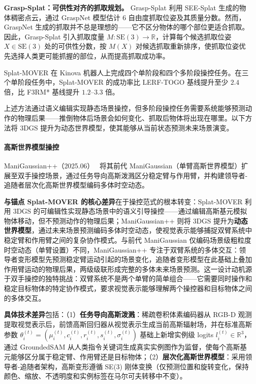 \textbf{Grasp-Splat：可供性对齐的抓取规划。}
Grasp-Splat 利用 SEE-Splat 生成的物体稠密点云，通过 GraspNet 模型估计 6 自由度抓取位姿及其质量分数。然而，GraspNet 生成的抓取并不总是理想的——它不区分物体的哪个部位更适合抓取。因此，Grasp-Splat 引入抓取度量 $M: \text{SE}(3) \to \mathbb{R}$，计算每个候选抓取位姿 $X \in \text{SE}(3)$ 处的可供性分数，按 $M(X)$ 对候选抓取重新排序，使抓取位姿优先选择人类更可能抓握的部位，从而提高抓取成功率。

Splat-MOVER 在 Kinova 机器人上完成四个单阶段和四个多阶段操控任务。在三个单阶段任务中，Splat-MOVER 的成功率比 LERF-TOGO 基线提升至少 $2.4$ 倍，比 F3RM* 基线提升 $1.2$--$3.3$ 倍。

上述方法通过语义编辑实现静态场景操控，但多阶段操控任务需要系统能够预测动作的物理后果——推倒物体后场景会如何变化、抓取后物体将出现在哪里。以下方法将 3DGS 提升为动态世界模型，使其能够从当前状态预测未来场景演变。

\paragraph{高斯世界模型操控}

ManiGaussian++（2025.06）~\cite{2506_19842} 将其前代 ManiGaussian（单臂高斯世界模型）扩展至双手操控场景，通过任务导向高斯泼溅区分稳定臂与作用臂，并构建领导者-追随者层次化高斯世界模型编码多体时空动态。

\textbf{与锚点 Splat-MOVER 的核心差异}在于操控范式的根本转变：Splat-MOVER 利用 3DGS 的可编辑性实现静态场景中的语义引导操控——通过编辑高斯基元模拟物体移动，但不预测动作的物理后果；ManiGaussian++ 则将 3DGS 提升为\textbf{动态世界模型}，通过未来场景预测编码多体时空动态，使视觉表示能够捕捉双臂系统中稳定臂和作用臂之间的复杂协作模式。与前代 ManiGaussian 仅编码场景级粗粒度时空动态（单臂设置）不同，ManiGaussian++ 专注于双臂系统的多体交互：领导者变形模型先预测稳定臂运动引起的场景变化，追随者变形模型在此基础上叠加作用臂运动的物理后果，两级级联形成完整的多体未来场景预测。这一设计动机源于双手操控的独特挑战：双臂系统不是两个单臂的简单组合——它需要同时操作和稳定目标物体的特定协作模式，要求视觉表示能够理解两个操控器和目标物体之间的多体交互。

\textbf{具体技术差异}包括：（1）\textbf{任务导向高斯泼溅}：稀疏卷积体素编码器从 RGB-D 观测提取视觉表示后，前馈高斯回归器从视觉表示生成当前高斯辐射场，并在标准高斯参数 $\theta_i^{(t)} = (\mu_i^{(t)}, c_i^{(t)}, r_i^{(t)}, s_i^{(t)}, \sigma_i^{(t)})$ 基础上新增实例级 logits $l_i^{(t)} \in \mathbb{R}^3$，通过 GroundedSAM 从人类指令关键词生成真实实例图作为监督，使每个高斯基元能够区分属于稳定臂、作用臂还是目标物体；（2）\textbf{层次化高斯世界模型}：采用领导者-追随者架构，高斯变形遵循 SE(3) 刚体变换（仅预测位置和旋转变化，保持颜色、缩放、不透明度和实例标签在马尔可夫转移中不变）。

